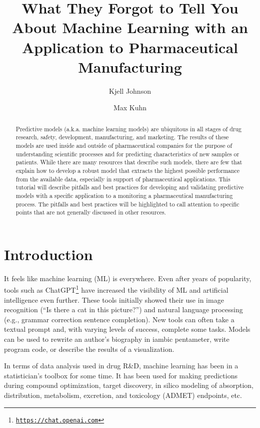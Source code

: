 \documentclass[
  letterpaper,
  DIV=11,
  numbers=noendperiod]{scrartcl}
\title{What They Forgot to Tell You About Machine Learning with an
Application to Pharmaceutical Manufacturing}
\author{Kjell Johnson \and Max Kuhn}
\date{}
\begin{document}
\maketitle
\begin{abstract}
Predictive models (a.k.a. machine learning models) are ubiquitous in all
stages of drug research, safety, development, manufacturing, and
marketing. The results of these models are used inside and outside of
pharmaceutical companies for the purpose of understanding scientific
processes and for predicting characteristics of new samples or patients.
While there are many resources that describe such models, there are few
that explain how to develop a robust model that extracts the highest
possible performance from the available data, especially in support of
pharmaceutical applications. This tutorial will describe pitfalls and
best practices for developing and validating predictive models with a
specific application to a monitoring a pharmaceutical manufacturing
process. The pitfalls and best practices will be highlighted to call
attention to specific points that are not generally discussed in other
resources.
\end{abstract}
\ifdefined\Shaded\renewenvironment{Shaded}{\begin{tcolorbox}[interior hidden, frame hidden, borderline west={3pt}{0pt}{shadecolor}, breakable, sharp corners, boxrule=0pt, enhanced]}{\end{tcolorbox}}\fi

\hypertarget{introduction}{%
\section{Introduction}\label{introduction}}

It feels like machine learning (ML) is everywhere. Even after years of
popularity, tools such as ChatGPT\footnote{\href{https://chat.openai.com/}{\texttt{https://chat.openai.com}}}
have increased the visibility of ML and artificial intelligence even
further. These tools initially showed their use in image recognition
(``Is there a cat in this picture?'') and natural language processing
(e.g., grammar correction sentence completion). New tools can often take
a textual prompt and, with varying levels of success, complete some
tasks. Models can be used to rewrite an author's biography in iambic
pentameter, write program code, or describe the results of a
visualization.

In terms of data analysis used in drug R\&D, machine learning has been
in a statistician's toolbox for some time. It has been used for making
predictions during compound optimization, target discovery, in silico
modeling of absorption, distribution, metabolism, excretion, and
toxicology (ADMET) endpoints, etc.
\end{document}
